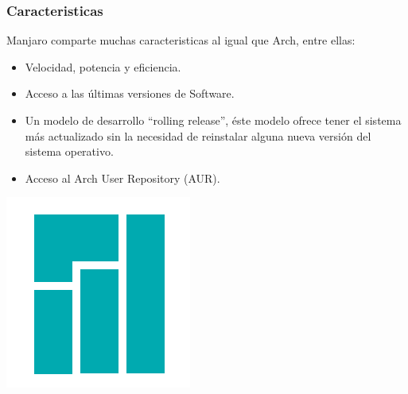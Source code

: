 \documentclass[9pt,t]{beamer}
\begin{document}
\begin{frame}\justifying
  \frametitle{Caracteristicas}
    Manjaro comparte muchas caracteristicas al igual que Arch, entre ellas: 
    \ \\
	\begin{itemize}\justifying
	  \item Velocidad, potencia y eficiencia.
	  \item Acceso a las últimas versiones de Software.
	  \item Un modelo de desarrollo ``rolling release'', éste modelo ofrece tener el sistema más actualizado 
	  		sin la necesidad de reinstalar alguna nueva versión del sistema operativo.
	  \item Acceso al Arch User Repository (AUR).
	\end{itemize}

	\begin{center}
      \includegraphics[height=0.20\textheight]{images/02_manjaroblue.png} \hspace*{0.0cm}
    \end{center}
\end{frame}
\end{document}
